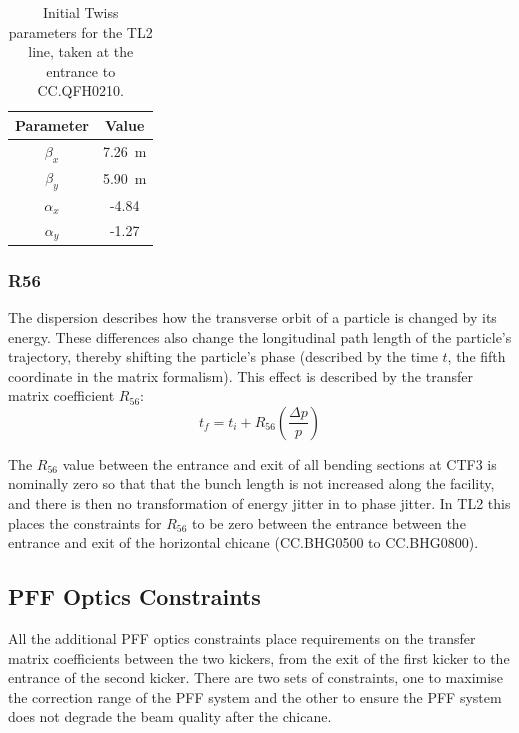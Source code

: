 \begin{table}
  \begin{center}
    \begin{tabular}{|c c|}
	   \hline
       Parameter & Value \\
       \hline
       \(\beta_x\) & 7.26~m\\
	   \(\beta_y\) & 5.90~m\\
	   \(\alpha_x\) & -4.84\\
	   \(\alpha_y\) & -1.27\\
	   \hline
    \end{tabular}
    \caption{Initial Twiss parameters for the TL2 line, taken at the entrance to CC.QFH0210.}
  	\label{t:tl2InitTwiss}
  \end{center}
\end{table}

\subsubsection{R56}

The dispersion describes how the transverse orbit of a particle is changed by its energy. These differences also change the longitudinal path length of the particle's trajectory, thereby shifting the particle's phase (described by the time \(t\), the fifth coordinate in the matrix formalism). This effect is described by the transfer matrix coefficient \(R_{56}\):
\begin{equation}
t_{f} = t_{i} + R_{56}\left(\frac{\Delta p}{p}\right)
\end{equation}

The \(R_{56}\) value between the entrance and exit of all bending sections at CTF3 is nominally zero so that that the bunch length is not increased along the facility, and there is then no transformation of energy jitter in to phase jitter. In TL2 this places the constraints for \(R_{56}\) to be zero between the entrance between the entrance and exit of the horizontal chicane (CC.BHG0500 to CC.BHG0800).

\subsection{PFF Optics Constraints}
\label{ss:pffOpticsReqs}

All the additional PFF optics constraints place requirements on the transfer matrix coefficients between the two kickers, from the exit of the first kicker to the entrance of the second kicker. There are two sets of constraints, one to maximise the correction range of the PFF system and the other to ensure the PFF system does not degrade the beam quality after the chicane.


